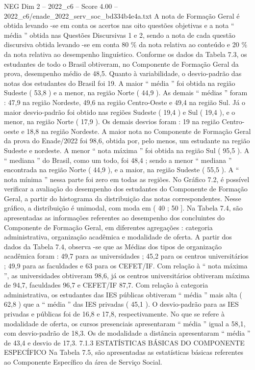 \begin{textsample}{NEG Dim 2 – 2022\_c6 – Score 4.00 – 2022\_c6/enade\_2022\_serv\_soc\_bd334b4e4a.txt}
A nota de Formação Geral é obtida levando -se em conta os acertos nas oito questões objetivas e a nota “ média ” obtida nas Questões Discursivas 1 e 2, sendo a nota de cada questão discursiva obtida levando -se em conta 80 \% da nota relativa ao conteúdo e 20 \% da nota relativa ao desempenho linguístico.
Conforme os dados da Tabela 7.3, os estudantes de todo o Brasil obtiveram, no Componente de Formação Geral da prova, desempenho médio de 48,5.
Quanto à variabilidade, o desvio-padrão das notas dos estudantes do Brasil foi 19.
A maior “ média ” foi obtida na região Sudeste ( 53,8 ) e a menor, na região Norte ( 44,9 ).
As demais “ médias ” foram : 47,9 na região Nordeste, 49,6 na região Centro-Oeste e 49,4 na região Sul.
Já o maior desvio-padrão foi obtido nas regiões Sudeste ( 19,4 ) e Sul ( 19,4 ), e o menor, na região Norte ( 17,9 ).
Os demais desvios foram : 19 na região Centro-oeste e 18,8 na região Nordeste.
A maior nota no Componente de Formação Geral da prova do Enade/2022 foi 98,6, obtida por, pelo menos, um estudante na região Sudeste e nordeste.
A menor “ nota máxima ” foi obtida na região Sul ( 95,5 ).
A “ mediana ” do Brasil, como um todo, foi 48,4 ; sendo a menor “ mediana ” encontrada na região Norte ( 44,9 ), e a maior, na região Sudeste ( 55,5 ).
A “ nota mínima ” nessa parte foi zero em todas as regiões.
No Gráfico 7.2, é possível verificar a avaliação do desempenho dos estudantes do Componente de Formação Geral, a partir do histograma da distribuição das notas correspondentes.
Nesse gráfico, a distribuição é unimodal, com moda em ( 40 ; 50 ].
Na Tabela 7.4, são apresentadas as informações referentes ao desempenho dos concluintes do Componente de Formação Geral, em diferentes agregações : categoria administrativa, organização acadêmica e modalidade de oferta.
A partir dos dados da Tabela 7.4, observa -se que as Médias dos tipos de organização acadêmica foram : 49,7 para as universidades ; 45,2 para os centros universitários ; 49,9 para as faculdades e 63 para os CEFET/IF.
Com relação à “ nota máxima ”, as universidades obtiveram 98,6, já os centros universitários obtiveram máxima de 94,7, faculdades 96,7 e CEFET/IF 87,7.
Com relação à categoria administrativa, os estudantes das IES públicas obtiveram “ média ” mais alta ( 62,8 ) que a “ média ” das IES privadas ( 45,1 ).
O desvio-padrão para as IES privadas e públicas foi de 16,8 e 17,8, respectivamente.
No que se refere à modalidade de oferta, os cursos presenciais apresentaram “ média ” igual a 58,1, com desvio-padrão de 18,3.
Os de modalidade a distância apresentaram “ média ” de 43,4 e desvio de 17,3. 7.1.3 ESTATÍSTICAS BÁSICAS DO COMPONENTE ESPECÍFICO Na Tabela 7.5, são apresentadas as estatísticas básicas referentes ao Componente Específico da área de Serviço Social.

\end{textsample}
